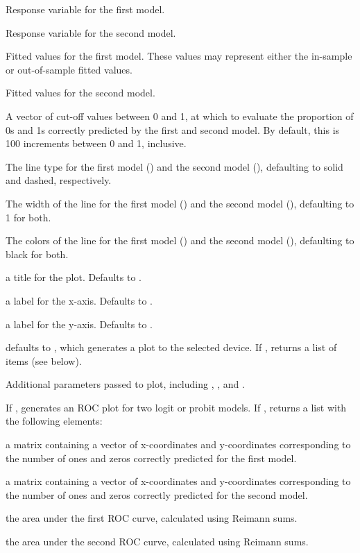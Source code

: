 \begin{Arguments}
\begin{ldescription}
\item[\code{y1}] Response variable for the first model.
\item[\code{y2}] Response variable for the second model.
\item[\code{fitted1}] Fitted values for the first model.  These values
may represent either the in-sample or out-of-sample fitted values.
\item[\code{fitted2}] Fitted values for the second model.
\item[\code{cutoff}] A vector of cut-off values between 0 and 1, at
which to evaluate the proportion of 0s and 1s correctly predicted by
the first and second model.  By default, this is 100 increments
between 0 and 1, inclusive.
\item[\code{lty1, lty2}] The line type for the first model () and
the second model (), defaulting to solid and dashed,
respectively.
\item[\code{lwd1, lwd2}] The width of the line for the first model
() and the second model (), defaulting to 1 for both.
\item[\code{col1, col2}] The colors of the line for the first
model () and the second model (), defaulting to
black for both.
\item[\code{main}] a title for the plot.  Defaults to .
\item[\code{xlab}] a label for the x-axis.  Defaults to .
\item[\code{ylab}] a label for the y-axis.  Defaults to .
\item[\code{plot}] defaults to , which generates a plot to the
selected device.  If , returns a list of
items (see below).
\item[\code{...}] Additional parameters passed to plot, including
, , and .  
\end{ldescription}
\end{Arguments}
\begin{Value}
If ,  generates an ROC plot for
two logit or probit models.  If , 
returns a list with the following elements:
\begin{ldescription}
\item[\code{roc1}] a matrix containing a vector of x-coordinates and
y-coordinates corresponding to the number of ones and zeros correctly
predicted for the first model.
\item[\code{roc2}] a matrix containing a vector of x-coordinates and
y-coordinates corresponding to the number of ones and zeros correctly
predicted for the second model.
\item[\code{area1}] the area under the first ROC curve, calculated using
Reimann sums.
\item[\code{area2}] the area under the second ROC curve, calculated using
Reimann sums.
\end{ldescription}
\end{Value}
